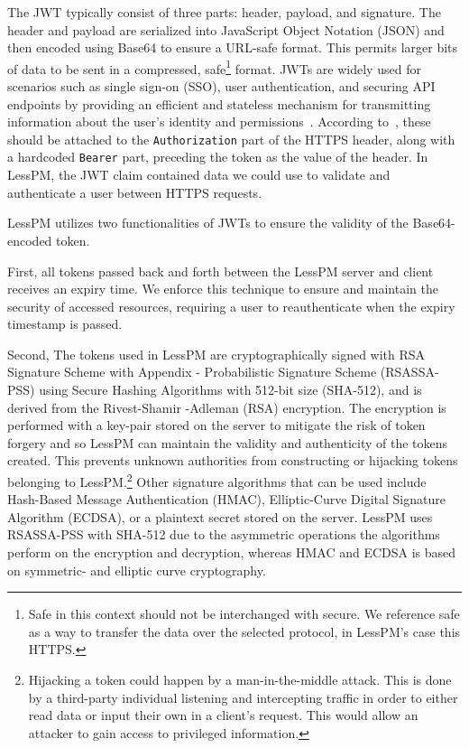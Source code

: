 The JWT typically consist of three parts: header, payload, and signature.
The header and payload are serialized into JavaScript Object Notation (JSON)
and then encoded using Base64 to ensure a URL-safe format.
This permits larger bits of data to be sent in a compressed, safe\footnote{
  Safe in this context should not be interchanged with secure.
  We reference safe as a way to transfer the data over the selected protocol,
  in LessPM's case this HTTPS.
} format.
JWTs are widely used for scenarios such as single sign-on (SSO), user
authentication, and securing API endpoints by providing an efficient and
stateless mechanism for transmitting information about the user's identity
and permissions~\cite{karande2018securingnode}.
According to~\cite{RFC7519}, these should be attached to the
\texttt{Authorization} part of the HTTPS header, along with a hardcoded
\texttt{Bearer} part, preceding the token as the value of the header.
In LessPM, the JWT claim contained data we could use to validate and
authenticate a user between HTTPS requests.

LessPM utilizes two functionalities of JWTs to ensure the validity of the
Base64-encoded token.

First, all tokens passed back and forth between the LessPM server and client
receives an expiry time.
We enforce this technique to ensure and maintain the security of accessed
resources, requiring a user to reauthenticate when the expiry timestamp is
passed.

Second, The tokens used in LessPM are cryptographically signed with RSA
Signature Scheme with Appendix - Probabilistic Signature Scheme (RSASSA-PSS)
using Secure Hashing Algorithms with 512-bit size (SHA-512), and is derived
from the Rivest-Shamir -Adleman (RSA) encryption.
The encryption is performed with a key-pair stored on the server to mitigate
the risk of token forgery and so LessPM can maintain the validity and
authenticity of the tokens created.
This prevents unknown authorities from constructing or hijacking tokens
belonging to LessPM\@.\footnote{
  Hijacking a token could happen by a man-in-the-middle attack.
  This is done by a third-party individual listening and intercepting traffic
  in order to either read data or input their own in a client's request.
  This would allow an attacker to gain access to privileged information.
}
Other signature algorithms that can be used include Hash-Based Message
Authentication (HMAC), Elliptic-Curve Digital Signature Algorithm (ECDSA), or
a plaintext secret stored on the server.
LessPM uses RSASSA-PSS with SHA-512 due to the asymmetric operations the
algorithms perform on the encryption and decryption, whereas HMAC and ECDSA is
based on symmetric- and elliptic curve cryptography.


